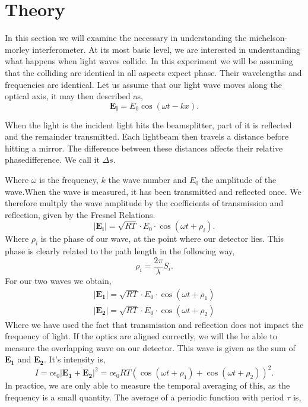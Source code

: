 \documentclass[working, oneside]{inputs/tuftebook}
\begin{document}
\let\cleardoublepage\clearpage
\section*{Theory}
In this section we will examine the necessary in understanding the michelson-morley interferometer. At its most basic level, we are interested in understanding what happens when light waves collide. In this experiment we will be assuming that the colliding are identical in all aspects expect phase. Their wavelengths and frequencies are identical. Let us assume that our light wave moves along the optical axis, it may then described as,
\[
	\bm{E_i} = E_0 \cos\left( \omega t - kx \right) 
.\] 
\begin{marginfigure}
    \centering
    \caption{When the light is the incident light hits the beamsplitter, part of it is reflected and the remainder transmitted. Each lightbeam then travels a distance before hitting a mirror. The difference between these distances affects their relative phasedifference. We call it $\Delta s$.}
    \label{fig:fig1}
\end{marginfigure}
Where $\omega$ is the frequency, $k$ the wave number and $E_0$ the amplitude of the wave.When the wave is measured, it has been transmitted and reflected once. We therefore multply the wave amplitude by the coefficients of transmission and reflection, given by the Fresnel Relations.\cite{grif}
 \[
	 \left|\bm{E_i}\right| = \sqrt{RT} \cdot E_0 \cdot \cos\left( \omega t + \rho _i \right) 
.\] 
Where $\rho_i$ is the phase of our wave, at the point where our detector lies. This phase is clearly related to the path length in the following way,
\[
\rho _i  =  \frac{2\pi}{\lambda} S_i
.\]
For our two waves we obtain,
\begin{align*}
	\left|\bm{E_1}\right| = \sqrt{RT} \cdot E_0 \cdot \cos\left( \omega t + \rho _1 \right) \\
	\left|\bm{E_2}\right| = \sqrt{RT} \cdot E_0 \cdot \cos\left( \omega t + \rho _2 \right) 
\end{align*}
Where we have used the fact that transmission and reflection does not impact the frequency of light.
If the optics are aligned correctly, we will the be able to measure the overlapping wave on our detector. This wave is given as the sum of $\bm{E_1}$ and $\bm{E_2}$. It's intensity is,
\[
I = c\epsilon_0 \left| \bm{E_1}+\bm{E_2} \right| ^2 = c\epsilon_0RT \left( \cos\left( \omega t +\rho_1 \right) +\cos\left( \omega t +\rho_2 \right)   \right)^2
.\] 
In practice, we are only able to measure the temporal averaging of this, as the frequency is a small quantity. The average of a periodic function with period $\tau$ is,
\end{document}
